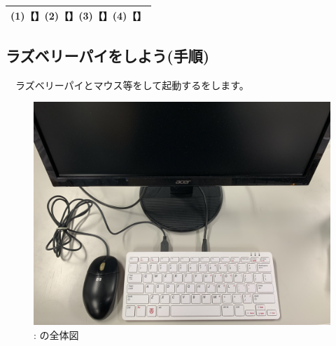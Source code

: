 \documentclass[a4paper,12pt]{jarticle}
\begin{document}
\begin{enumerate}
\begin{itemize}
                              \begin{table}[htbp]
                                \centering
                              \begin{tabular}{|c|}
                                \hline
                                    (1)【\hspace{3pc}】(2)【\hspace{3pc}】(3)【\hspace{3pc}】(4)【\hspace{3pc}】\\
                                    \hline
                                \end{tabular}
                                \end{table}
          \end{itemize}



          \clearpage
\subsection{ラズベリーパイをしよう(手順)}
\ \ ラズベリーパイとマウス等をして起動するをします。

\begin{figure}[ht]
  \centering
  \begin{minipage}{0.5\textwidth}
    {\upshape
      \includegraphics[width=0.8\linewidth]{connections01-2023.jpg}
      \newline
      : の全体図}

  \end{minipage}
\end{figure}


\end{enumerate}
\end{document}
